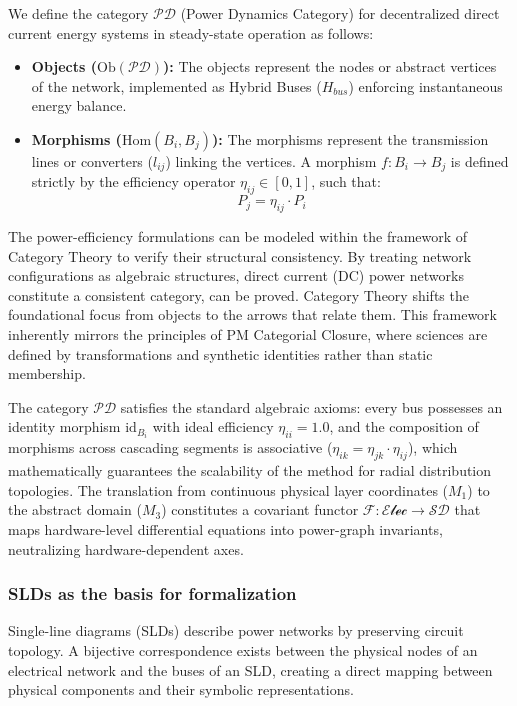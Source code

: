\documentclass[energies,accept,oneauthor,pdftex]{Definitions/mdpi}
\begin{document}
We define the category $\mathcal{PD}$ (Power Dynamics Category) for decentralized direct current energy systems in steady-state operation as follows:
\begin{itemize}
    \item \textbf{Objects ($\mathrm{Ob}(\mathcal{PD})$):} The objects represent the nodes or abstract vertices of the network, implemented as Hybrid Buses ($H_{bus}$) enforcing instantaneous energy balance.
    \item \textbf{Morphisms ($\mathrm{Hom}(B_i, B_j)$):} The morphisms represent the transmission lines or converters ($l_{ij}$) linking the vertices. A morphism $f: B_i \to B_j$ is defined strictly by the efficiency operator $\eta_{ij} \in [0, 1]$, such that:
    \begin{equation}
        P_j = \eta_{ij} \cdot P_i
    \end{equation}
\end{itemize}




The power-efficiency formulations can be modeled within the framework of Category Theory to verify their structural consistency. By treating network configurations as algebraic structures, direct current (DC) power networks constitute a consistent category, can be proved. Category Theory shifts the foundational focus from objects to the arrows that relate them. This framework inherently mirrors the principles of PM Categorial Closure, where sciences are defined by transformations and synthetic identities rather than static membership.


The category $\mathcal{PD}$ satisfies the standard algebraic axioms: every bus possesses an identity morphism $\mathrm{id}_{B_i}$ with ideal efficiency $\eta_{ii} = 1.0$, and the composition of morphisms across cascading segments is associative ($\eta_{ik} = \eta_{jk} \cdot \eta_{ij}$), which mathematically guarantees the scalability of the method for radial distribution topologies. The translation from continuous physical layer coordinates ($M_1$) to the abstract domain ($M_3$) constitutes a covariant functor $\mathscr{F} : \mathscr{Elec} \to \mathcal{SD}$ that maps hardware-level differential equations into power-graph invariants, neutralizing hardware-dependent axes.


 \subsubsection*{SLDs as the basis for formalization}
Single-line diagrams (SLDs) describe power networks by preserving circuit topology. A bijective correspondence exists between the physical nodes of an electrical network and the buses of an SLD, creating a direct mapping between physical components and their symbolic representations.
\end{document}
